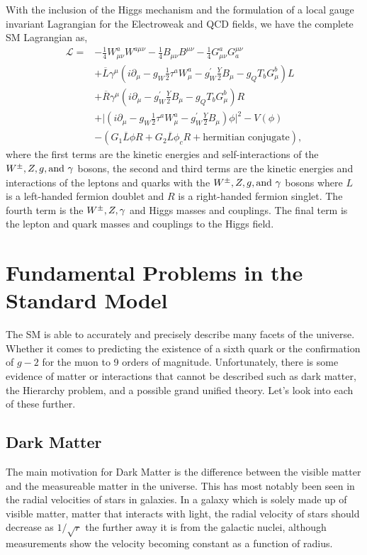 With the inclusion of the Higgs mechanism and the formulation of a local gauge invariant Lagrangian for the Electroweak and QCD fields, we have the complete SM Lagrangian as,
\begin{equation}\label{SMLagrangian}
\begin{split}
\mathcal{L}=&-\frac{1}{4}W^a_{\mu\nu}W^{a\mu\nu}-\frac{1}{4}B_{\mu\nu}B^{\mu\nu}-\frac{1}{4}G^a_{\mu\nu}G_a^{\mu\nu} \\
&+\overline{L}\gamma^\mu(i\partial_\mu-g_{W}\frac{1}{2}\tau^{a}W^{a}_{\mu}-g^{\prime}_{W}\frac{Y}{2}B_\mu-g_{Q}T_{b}G^{b}_{\mu})L \\
&+\overline{R}\gamma^\mu(i\partial_\mu-g^{\prime}_{W}\frac{Y}{2}B_\mu-g_{Q}T_{b}G^{b}_{\mu})R \\
&+\lvert(i\partial_\mu-g_{W}\frac{1}{2}\tau^{a}W^{a}_\mu-g^{\prime}_{W}\frac{Y}{2}B_\mu)\phi\lvert^2-V(\phi) \\
&-(G_1\overline{L}\phi R+G_2\overline{L}\phi_cR+\text{hermitian conjugate}),
\end{split}
\end{equation}
where the first terms are the kinetic energies and self-interactions of the $W^\pm,Z, g, \text{and } \gamma$ bosons, the second and third terms are the kinetic energies and interactions of the leptons and quarks with the $W^\pm,Z, g, \text{and } \gamma$ bosons where $L$ is a left-handed fermion doublet and $R$ is a right-handed fermion singlet. The fourth term is the $W^\pm,Z,\gamma$ and Higgs masses and couplings. The final term is the lepton and quark masses and couplings to the Higgs field.  

\section{Fundamental Problems in the Standard Model}
\label{sec:SMIssues}

The SM is able to accurately and precisely describe many facets of the universe. Whether it comes to predicting the existence of a sixth quark or the confirmation of $g - 2$ for the muon to 9 orders of magnitude. Unfortunately, there is some evidence of matter or interactions that cannot be described such as dark matter, the Hierarchy problem, and a possible grand unified theory. Let's look into each of these further.

\subsection{Dark Matter}
The main motivation for Dark Matter is the difference between the visible matter and the measureable matter in the universe. This has most notably been seen in the radial velocities of stars in galaxies. In a galaxy which is solely made up of visible matter, matter that interacts with light, the radial velocity of stars should decrease as $1/\sqrt{r}$ the further away it is from the galactic nuclei, although measurements show the velocity becoming constant as a function of radius.

